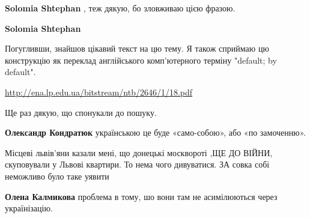\begin{itemize}
\begin{itemize}
\textbf{Solomia Shtephan} , теж дякую, бо зловживаю цією фразою.

 
\textbf{Solomia Shtephan} 

Погугливши, знайшов цікавий текст на цю тему. Я також сприймаю цю конструкцію
як переклад англійського комп'ютерного терміну "default; by default".

\url{http://ena.lp.edu.ua/bitstream/ntb/2646/1/18.pdf}

Ще раз дякую, що спонукали до пошуку.

 
\textbf{Олександр Кондратюк} українською це буде «само-собою», або «по замоченню».

\end{itemize}

 

Місцеві львів'яни казали мені, що донецькі москвороті ,ЩЕ ДО ВІЙНИ, скуповували
у Львові квартири. То нема чого дивуватися. ЗА совка собі неможливо було таке
уявити

\begin{itemize}
 
\textbf{Олена Калмикова} проблема в тому, шо вони там не асимілюються через українізацію.

 

\end{itemize}
\end{itemize}
